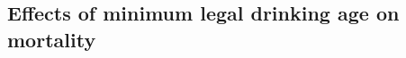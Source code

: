 \documentclass[12pt]{article}\usepackage[]{graphicx}\usepackage[]{color}
\begin{document}
% 

\subsection{Effects of minimum legal drinking age on mortality} 
\end{document}
